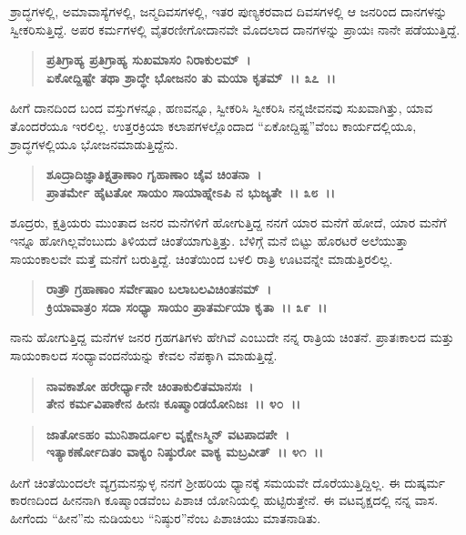 ಶ್ರಾದ್ಧಗಳಲ್ಲಿ, ಅಮಾವಾಸ್ಯೆಗಳಲ್ಲಿ, ಜನ್ಮದಿವಸಗಳಲ್ಲಿ, ಇತರ ಪುಣ್ಯಕರವಾದ ದಿವಸಗಳಲ್ಲಿ ಆ ಜನರಿಂದ ದಾನಗಳನ್ನು ಸ್ವೀಕರಿಸುತ್ತಿದ್ದೆ. ಅಪರ ಕರ್ಮಗಳಲ್ಲಿ ವೈತರಣೀಗೋದಾನವೇ ಮೊದಲಾದ ದಾನಗಳನ್ನು ಪ್ರಾಯಃ ನಾನೇ ಪಡೆಯುತ್ತಿದ್ದೆ.

\begin{verse}
\textbf{ಪ್ರತಿಗ್ರಾಹ್ಯ ಪ್ರತಿಗ್ರಾಹ್ಯ ಸುಖಮಾಸಂ ನಿರಾಕುಲಮ್~।}\\\textbf{ಏಕೋದ್ದಿಷ್ಟೇ ತಥಾ ಶ್ರಾದ್ಧೇ ಭೋಜನಂ ತು ಮಯಾ ಕೃತಮ್~।। ೩೭~।।}
\end{verse}

ಹೀಗೆ ದಾನದಿಂದ ಬಂದ ವಸ್ತುಗಳನ್ನೂ, ಹಣವನ್ನೂ, ಸ್ವೀಕರಿಸಿ ಸ್ವೀಕರಿಸಿ ನನ್ನ\break ಜೀವನವು ಸುಖವಾಗಿತ್ತು, ಯಾವ ತೊಂದರೆಯೂ ಇರಲಿಲ್ಲ. ಉತ್ತರಕ್ರಿಯಾ ಕಲಾಪಗಳಲ್ಲೊಂದಾದ “ಏಕೋದ್ದಿಷ್ಟ”ವೆಂಬ ಕಾರ್ಯದಲ್ಲಿಯೂ, ಶ್ರಾದ್ಧಗಳಲ್ಲಿಯೂ ಭೋಜನಮಾಡುತ್ತಿದ್ದೆನು.

\begin{verse}
\textbf{ಶೂದ್ರಾದಿಜ್ಞಾತಿಕ್ಷತ್ರಾಣಾಂ ಗೃಹಾಣಾಂ ಚೈವ ಚಿಂತನಾ~।}\\\textbf{ಪ್ರಾತರ್ಮೇ ಹೈಟತೋ ಸಾಯಂ ಸಾಯಾಹ್ನೇಽಪಿ ನ ಭುಜ್ಯತೇ~।। ೩೮~।।}
\end{verse}

ಶೂದ್ರರು, ಕ್ಷತ್ರಿಯರು ಮುಂತಾದ ಜನರ ಮನೆಗಳಿಗೆ ಹೋಗುತ್ತಿದ್ದ ನನಗೆ ಯಾರ ಮನೆಗೆ ಹೋದೆ, ಯಾರ ಮನೆಗೆ ಇನ್ನೂ ಹೋಗಿಲ್ಲವೆಂಬುದು ತಿಳಿಯದೆ ಚಿಂತೆಯಾಗುತ್ತಿತ್ತು. ಬೆಳಿಗ್ಗೆ ಮನೆ ಬಿಟ್ಟು ಹೊರಟರೆ ಅಲೆಯುತ್ತಾ ಸಾಯಂಕಾಲವೇ ಮತ್ತೆ ಮನೆಗೆ ಬರುತ್ತಿದ್ದೆ. ಚಿಂತೆಯಿಂದ ಬಳಲಿ ರಾತ್ರಿ ಊಟವನ್ನೇ ಮಾಡುತ್ತಿರಲಿಲ್ಲ.

\begin{verse}
\textbf{ರಾತ್ರೌ ಗ್ರಹಾಣಾಂ ಸರ್ವೇಷಾಂ ಬಲಾಬಲವಿಚಿಂತನಮ್~।}\\\textbf{ಕ್ರಿಯಾವಾತ್ರಂ ಸದಾ ಸಂಧ್ಯಾ ಸಾಯಂ ಪ್ರಾತರ್ಮಯಾ ಕೃತಾ~।। ೩೯~।।}
\end{verse}

ನಾನು ಹೋಗುತ್ತಿದ್ದ ಮನೆಗಳ ಜನರ ಗ್ರಹಗತಿಗಳು ಹೇಗಿವೆ ಎಂಬುದೇ ನನ್ನ ರಾತ್ರಿಯ ಚಿಂತನೆ. ಪ್ರಾತಃಕಾಲದ ಮತ್ತು ಸಾಯಂಕಾಲದ ಸಂಧ್ಯಾವಂದನೆಯನ್ನು ಕೇವಲ ನೆಪಕ್ಕಾಗಿ ಮಾಡುತ್ತಿದ್ದೆ.

\begin{verse}
\textbf{ನಾವಕಾಶೋ ಹರೇರ್ಧ್ಯಾನೇ ಚಿಂತಾಕುಲಿತಮಾನಸಃ~।}\\\textbf{ತೇನ ಕರ್ಮವಿಪಾಕೇನ ಹೀನಃ ಕೂಷ್ಮಾಂಡಯೋನಿಜಃ~।। ೪೦~।। }
\end{verse}

\begin{verse}
\textbf{ಜಾತೋಽಹಂ ಮುನಿಶಾರ್ದೂಲ ವೃಕ್ಷೇsಸ್ಮಿನ್ ವಟಪಾದಪೇ~।}\\\textbf{ಇತ್ಯಾಕರ್ಣೋದಿತಂ ವಾಕ್ಯಂ ನಿಷ್ಠುರೋ ವಾಕ್ಯ ಮಬ್ರವೀತ್~।। ೪೧~।।}
\end{verse}

ಹೀಗೆ ಚಿಂತೆಯಿಂದಲೇ ವ್ಯಗ್ರಮನಸ್ಸುಳ್ಳ ನನಗೆ ಶ‍್ರೀಹರಿಯ ಧ್ಯಾನಕ್ಕೆ ಸಮಯವೇ ದೊರೆಯುತ್ತಿದ್ದಿಲ್ಲ. ಈ ದುಷ್ಕರ್ಮ ಕಾರಣದಿಂದ ಹೀನನಾಗಿ ಕೂಷ್ಮಾಂಡವೆಂಬ ಪಿಶಾಚ ಯೋನಿಯಲ್ಲಿ ಹುಟ್ಟಿರುತ್ತೇನೆ. ಈ ವಟವೃಕ್ಷದಲ್ಲಿ ನನ್ನ ವಾಸ. ಹೀಗೆಂದು “ಹೀನ”ನು ನುಡಿಯಲು “ನಿಷ್ಠುರ”ನೆಂಬ ಪಿಶಾಚಿಯು ಮಾತನಾಡಿತು.

